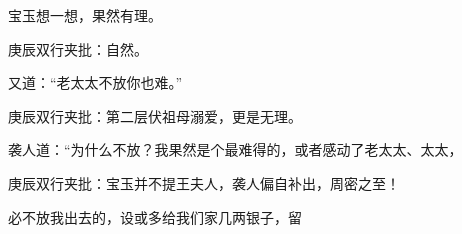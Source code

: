 \begin{parag}
    宝玉想一想，果然有理。\begin{note}庚辰双行夹批：自然。\end{note}又道：“老太太不放你也难。”\begin{note}庚辰双行夹批：第二层伏祖母溺爱，更是无理。\end{note}袭人道：“为什么不放？我果然是个最难得的，或者感动了老太太、太太，\begin{note}庚辰双行夹批：宝玉并不提王夫人，袭人偏自补出，周密之至！\end{note}必不放我出去的，设或多给我们家几两银子，留
\end{parag}

